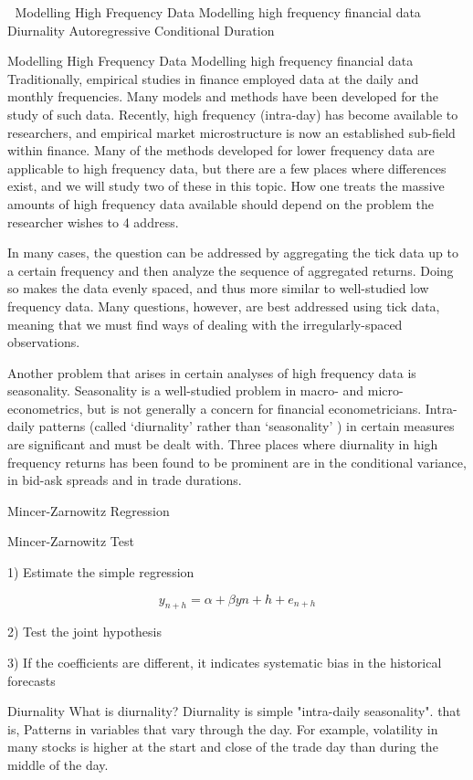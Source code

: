

Modelling High Frequency Data
Modelling high frequency financial data
Diurnality
Autoregressive Conditional Duration

Modelling High Frequency Data
Modelling high frequency financial data 
Traditionally, empirical studies in  finance employed data at the daily and monthly frequencies. Many models and methods have been developed for the study of such data. Recently, high frequency (intra-day) has become available to researchers, and empirical market microstructure is now an established sub-field within  finance. Many of the methods developed for lower frequency data are applicable to high frequency data, but there are a few places where differences exist, and we will study two of these in this topic. How one treats the massive amounts of high frequency data available should depend on the problem the researcher wishes to 4 address. 

In many cases, the question can be addressed by aggregating the  tick data up to a certain frequency and then analyze the sequence of aggregated returns. Doing so makes the data 
evenly spaced, and thus more similar to well-studied low frequency data. Many questions, however, are best addressed using tick data, meaning that we must  find ways of dealing with 
the irregularly-spaced observations. 

Another problem that arises in certain analyses of high frequency data is seasonality. Seasonality is a well-studied problem in macro- and micro-econometrics, but is not generally a concern for financial econometricians. Intra-daily patterns (called ‘diurnality’ rather than ‘seasonality’ ) in certain measures are significant and must be dealt with. Three places where diurnality in high frequency returns has been found to be prominent are in the conditional variance, in bid-ask spreads and in trade durations.  

Mincer-Zarnowitz Regression

Mincer-Zarnowitz Test

1) Estimate the simple regression

\[y_{n+h}= \alpha + \beta y{n+h}+ e_{n+h}\]

2) Test the joint hypothesis	

3) If the coefficients are different, it indicates systematic bias in the historical forecasts


Diurnality
What is diurnality?
Diurnality is simple "intra-daily seasonality". that is, Patterns in variables that vary through the day.
For example, volatility in many stocks is higher at the start and close of the trade  day than during the middle of the day.

